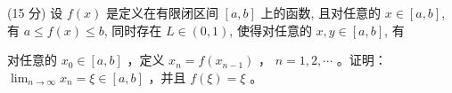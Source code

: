 \par{}
(15 分) 设 $f(x)$ 是定义在有限闭区间 $[a, b]$ 上的函数, 且对任意的 $x \in [a, b]$, 有 $a \leq f(x) \leq b$, 同时存在 $L \in (0, 1)$, 使得对任意的 $x, y \in [a, b]$, 有\par
\nopagebreak[4]
对任意的  $x_{0} \in [a, b]$ ，定义  $x_{n} = f(x_{n-1})$ ， $n = 1, 2, \cdots$ 。证明： $\lim_{n \to \infty} x_{n} = \xi \in [a, b]$ ，并且  $f(\xi) = \xi$ 。\par
